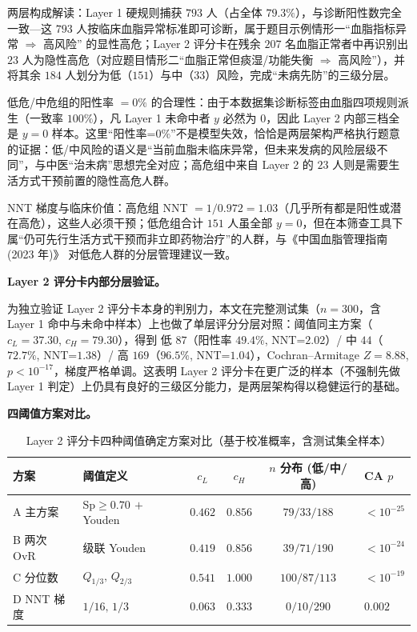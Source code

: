 \documentclass{MathorCupmodeling}
\begin{document}
两层构成解读：Layer 1 硬规则捕获 $793$ 人（占全体 $79.3\%$），与诊断阳性数完全一致---这 $793$ 人按临床血脂异常标准即可诊断，属于题目示例情形一``血脂指标异常 $\Rightarrow$ 高风险'' 的显性高危；Layer 2 评分卡在残余 $207$ 名血脂正常者中再识别出 $23$ 人为隐性高危（对应题目情形二``血脂正常但痰湿/功能失衡 $\Rightarrow$ 高风险''），并将其余 $184$ 人划分为低（$151$）与中（$33$）风险，完成``未病先防''的三级分层。

低危/中危组的阳性率 $=0\%$ 的合理性：由于本数据集诊断标签由血脂四项规则派生（一致率 $100\%$），凡 Layer 1 未命中者 $y$ 必然为 $0$，因此 Layer 2 内部三档全是 $y=0$ 样本。这里``阳性率=$0\%$''不是模型失效，恰恰是两层架构严格执行题意的证据：低/中风险的语义是``当前血脂未临床异常，但未来发病的风险层级不同''，与中医``治未病''思想完全对应；高危组中来自 Layer 2 的 $23$ 人则是需要生活方式干预前置的隐性高危人群。

NNT 梯度与临床价值：高危组 NNT $=1/0.972=1.03$（几乎所有都是阳性或潜在高危），这些人必须干预；低危组合计 $151$ 人虽全部 $y=0$，但在本筛查工具下属``仍可先行生活方式干预而非立即药物治疗''的人群，与《中国血脂管理指南 (2023 年)》\cite{cn-dyslipidemia-2023} 对低危人群的分层管理建议一致。

\noindent\textbf{Layer 2 评分卡内部分层验证。}

为独立验证 Layer 2 评分卡本身的判别力，本文在完整测试集（$n=300$，含 Layer 1 命中与未命中样本）上也做了单层评分分层对照：阈值同主方案（$c_L=37.30$, $c_H=79.30$），得到 低 $87$（阳性率 $49.4\%$, NNT=$2.02$）/ 中 $44$（$72.7\%$, NNT=$1.38$）/ 高 $169$（$96.5\%$, NNT=$1.04$），Cochran--Armitage $Z=8.88$, $p<10^{-17}$，梯度严格单调。这表明 Layer 2 评分卡在更广泛的样本（不强制先做 Layer 1 判定）上仍具有良好的三级区分能力，是两层架构得以稳健运行的基础。

\noindent\textbf{四阈值方案对比。}

\begin{table}[H]
\centering\small
\caption{Layer 2 评分卡四种阈值确定方案对比（基于校准概率，含测试集全样本）}\label{tab:q2-thr-schemes}
\begin{tabular}{@{}l l c c c l@{}}
\toprule
方案 & 阈值定义 & $c_L$ & $c_H$ & $n$ 分布 (低/中/高) & CA $p$ \\
\midrule
A 主方案 & Sp$\ge0.70\,+\,$Youden & $0.462$ & $0.856$ & $79/33/188$ & $<10^{-25}$ \\
B 两次 OvR & 级联 Youden & $0.419$ & $0.856$ & $39/71/190$ & $<10^{-24}$ \\
C 分位数 & $Q_{1/3},\,Q_{2/3}$ & $0.541$ & $1.000$ & $100/87/113$ & $<10^{-19}$ \\
D NNT 梯度 & $1/16,\,1/3$ & $0.063$ & $0.333$ & $0/10/290$ & $0.002$ \\
\bottomrule
\end{tabular}
\end{table}
\end{document}
